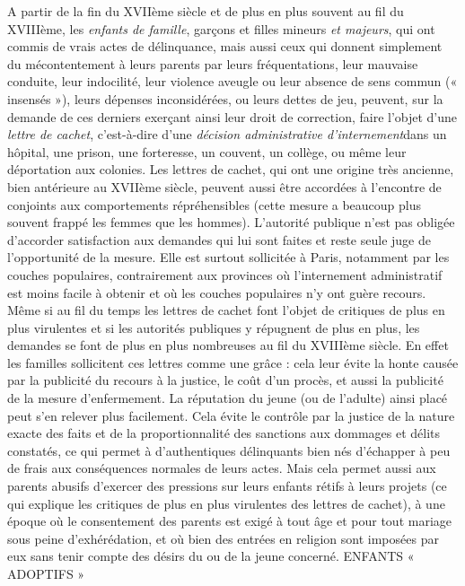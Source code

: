  A partir de la fin du XVIIème siècle et de plus en plus souvent au fil du XVIIIème, les \emph{enfants de famille}, garçons et filles mineurs \emph{et majeurs}, qui ont commis de vrais actes de délinquance, mais aussi ceux qui donnent simplement du mécontentement à leurs parents par leurs fréquentations, leur mauvaise conduite, leur indocilité, leur violence aveugle ou leur absence de sens commun (« insensés »), leurs dépenses inconsidérées, ou leurs dettes de jeu, peuvent, sur la demande de ces derniers exerçant ainsi leur droit de correction, faire l'objet d'une \emph{lettre de cachet}, c'est-à-dire d'une \emph{décision administrative d'internement}dans un hôpital, une prison, une forteresse, un couvent, un collège, ou même leur déportation aux colonies. Les lettres de cachet, qui ont une origine très ancienne, bien antérieure au XVIIème siècle, peuvent aussi être accordées à l'encontre de conjoints aux comportements répréhensibles (cette mesure a beaucoup plus souvent frappé les femmes que les hommes). 
 L'autorité publique n'est pas obligée d'accorder satisfaction aux demandes qui lui sont faites et reste seule juge de l'opportunité de la mesure. Elle est surtout sollicitée à Paris, notamment par les couches populaires, contrairement aux provinces où l'internement administratif est moins facile à obtenir et où les couches populaires n'y ont guère recours. Même si au fil du temps les lettres de cachet font l'objet de critiques de plus en plus virulentes et si les autorités publiques y répugnent de plus en plus, les demandes se font de plus en plus nombreuses au fil du XVIIIème siècle. 
 En effet les familles sollicitent ces lettres comme une grâce : cela leur évite la honte causée par la publicité du recours à la justice, le coût d'un procès, et aussi la publicité de la mesure d'enfermement. La réputation du jeune (ou de l'adulte) ainsi placé peut s'en relever plus facilement. Cela évite le contrôle par la justice de la nature exacte des faits et de la proportionnalité des sanctions aux dommages et délits constatés, ce qui permet à d'authentiques délinquants bien nés d'échapper à peu de frais aux conséquences normales de leurs actes. 
 Mais cela permet aussi aux parents abusifs d'exercer des pressions sur leurs enfants rétifs à leurs projets (ce qui explique les critiques de plus en plus virulentes des lettres de cachet), à une époque où le consentement des parents est exigé à tout âge et pour tout mariage sous peine d'exhérédation, et où bien des entrées en religion sont imposées par eux sans tenir compte des désirs du ou de la jeune concerné. 
ENFANTS « ADOPTIFS »
